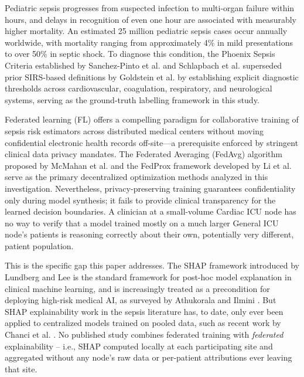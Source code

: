 \documentclass[runningheads]{llncs}
\begin{document}
Pediatric sepsis progresses from suspected infection to multi-organ failure within hours, and delays in recognition of even one hour are associated with measurably higher mortality. An estimated 25 million pediatric sepsis cases occur annually worldwide, with mortality ranging from approximately 4\% in mild presentations to over 50\% in septic shock. To diagnose this condition, the Phoenix Sepsis Criteria established by Sanchez-Pinto et al. \cite{sanchezpinto2024phoenix} and Schlapbach et al. \cite{schlapbach2024phoenix} superseded prior SIRS-based definitions by Goldstein et al. \cite{goldstein2005sirs} by establishing explicit diagnostic thresholds across cardiovascular, coagulation, respiratory, and neurological systems, serving as the ground-truth labelling framework in this study.

Federated learning (FL) offers a compelling paradigm for collaborative training of sepsis risk estimators across distributed medical centers without moving confidential electronic health records off-site---a prerequisite enforced by stringent clinical data privacy mandates. The Federated Averaging (FedAvg) algorithm proposed by McMahan et al. \cite{mcmahan2017fedavg} and the FedProx framework developed by Li et al. \cite{li2020fedprox} serve as the primary decentralized optimization methods analyzed in this investigation. Nevertheless, privacy-preserving training guarantees confidentiality only during model synthesis; it fails to provide clinical transparency for the learned decision boundaries. A clinician at a small-volume Cardiac ICU node has no way to verify that a model trained mostly on a much larger General ICU node's patients is reasoning correctly about their own, potentially very different, patient population.

This is the specific gap this paper addresses. The SHAP framework introduced by Lundberg and Lee \cite{lundberg2017shap} is the standard framework for post-hoc model explanation in clinical machine learning, and is increasingly treated as a precondition for deploying high-risk medical AI, as surveyed by Athukorala and Ilmini \cite{athukorala2026explainable}. But SHAP explainability work in the sepsis literature has, to date, only ever been applied to centralized models trained on pooled data, such as recent work by Chanci et al. \cite{chanci2025machine}. No published study combines federated training with \emph{federated} explainability -- i.e., SHAP computed locally at each participating site and aggregated without any node's raw data or per-patient attributions ever leaving that site.
\end{document}

